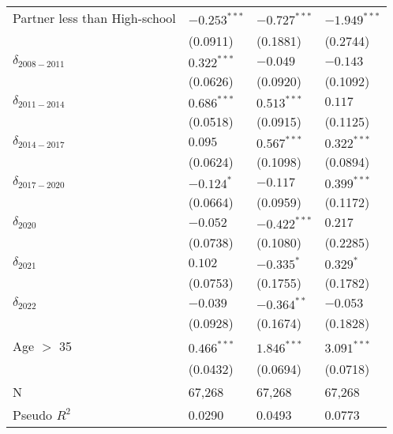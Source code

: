 \begin{tabular}{llll}
Partner less than High-school &     $-0.253^{***}$ &     $-0.727^{***}$ &     $-1.949^{***}$ \\
                              &           (0.0911) &           (0.1881) &           (0.2744) \\
$\delta_{2008-2011}$          &      $0.322^{***}$ &           $-0.049$ &           $-0.143$ \\
                              &           (0.0626) &           (0.0920) &           (0.1092) \\
$\delta_{2011-2014}$          &      $0.686^{***}$ &      $0.513^{***}$ &            $0.117$ \\
                              &           (0.0518) &           (0.0915) &           (0.1125) \\
$\delta_{2014-2017}$          &            $0.095$ &      $0.567^{***}$ &      $0.322^{***}$ \\
                              &           (0.0624) &           (0.1098) &           (0.0894) \\
$\delta_{2017-2020}$          &         $-0.124^*$ &           $-0.117$ &      $0.399^{***}$ \\
                              &           (0.0664) &           (0.0959) &           (0.1172) \\
$\delta_{2020}$               &           $-0.052$ &     $-0.422^{***}$ &            $0.217$ \\
                              &           (0.0738) &           (0.1080) &           (0.2285) \\
$\delta_{2021}$               &            $0.102$ &         $-0.335^*$ &          $0.329^*$ \\
                              &           (0.0753) &           (0.1755) &           (0.1782) \\
$\delta_{2022}$               &           $-0.039$ &      $-0.364^{**}$ &           $-0.053$ \\
                              &           (0.0928) &           (0.1674) &           (0.1828) \\
Age $>$ 35                    &      $0.466^{***}$ &      $1.846^{***}$ &      $3.091^{***}$ \\
                              &           (0.0432) &           (0.0694) &           (0.0718) \\
N                             &             67,268 &             67,268 &             67,268 \\
Pseudo $R^2$                  &             0.0290 &             0.0493 &             0.0773 \\
\bottomrule
\end{tabular}
